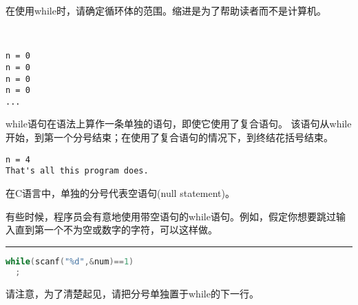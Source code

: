 \begin{frame}[fragile]
在使用while时，请确定循环体的范围。缩进是为了帮助读者而不是计算机。
\end{frame}

\begin{frame}[fragile]
  \begin{minipage}{0.6\textwidth}
    
  \end{minipage} ~~~~\pause 
  \begin{minipage}{0.3\textwidth}
\begin{lstlisting}[backgroundcolor=\color{red!10}]
n = 0
n = 0
n = 0
n = 0
... 
\end{lstlisting}    
  \end{minipage}
\end{frame}

\begin{frame}[fragile]
while语句在语法上算作一条单独的语句，即使它使用了复合语句。
该语句从while开始，到第一个分号结束；在使用了复合语句的情况下，到终结花括号结束。
\end{frame}

\begin{frame}[fragile]

\pause 
\begin{lstlisting}[backgroundcolor=\color{red!10}]
n = 4
That's all this program does.
\end{lstlisting}
\end{frame}

\begin{frame}[fragile]
在C语言中，\textcolor{acolor1}{单独的分号代表空语句(null statement)。}
\end{frame}

\begin{frame}[fragile]
有些时候，程序员会有意地使用带空语句的while语句。例如，假定你想要跳过输入直到第一个不为空或数字的字符，可以这样做。
\rule{\textwidth}{1mm}\pause 

\begin{lstlisting}[language=c]
while(scanf("%d",&num)==1)
  ;
\end{lstlisting}\pause

请注意，为了清楚起见，请把分号单独置于while的下一行。
\end{frame}

